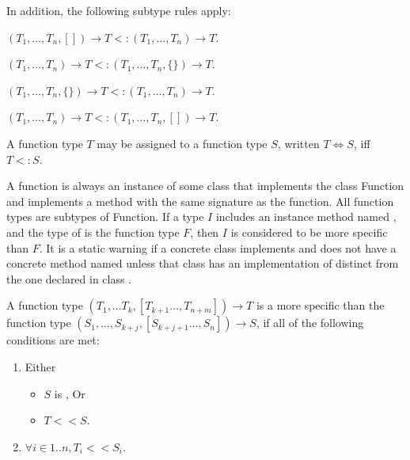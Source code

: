 \documentclass{article}
\newcommand{\code}[1]{{\sf #1}}
\begin{document}

\LMHash{}
In addition, the following subtype rules apply:


$(T_1, \ldots, T_n, []) \rightarrow T <: (T_1, \ldots, T_n) \rightarrow T$.

$(T_1, \ldots, T_n) \rightarrow T <: (T_1, \ldots, T_n, \{\}) \rightarrow T$.

$(T_1, \ldots, T_n, \{\}) \rightarrow T <: (T_1, \ldots, T_n) \rightarrow T$.

$(T_1, \ldots, T_n) \rightarrow T <: (T_1, \ldots, T_n, []) \rightarrow T$.


\LMHash{}
A function type $T$ may be assigned to a function type $S$, written  $T \Longleftrightarrow S$, iff  $T <: S$. 

\LMHash{}
A function is always an instance of some class that implements the class \code{Function} and implements a \CALL{} method with the same signature as the function. All function types are subtypes of \code{Function}.
If a type $I$ includes an instance method named \CALL{}, and the type of \CALL{} is the function type $F$, then $I$ is considered to be more specific than $F$.  It is a static warning if a concrete class implements  and does not have a concrete method named \CALL{} unless that class has an implementation of  distinct from the one declared in class .





\LMHash{}
A function type $(T_1, \ldots T_{k}, [T_{k+1}  \ldots, T_{n+m}]) \rightarrow T$ is a more specific than the
function type $(S_1, \ldots, S_{k+j}, [S_{k+j+1} \ldots, S_{n}]) \rightarrow S$, if all of the following conditions are met:
\begin{enumerate}
\item Either
\begin{itemize}
\item $S$ is \VOID{}, Or
\item  $T << S$.
\end{itemize}
\item $\forall i \in 1 .. n, T_i << S_i$.
\end{enumerate}
\end{document}
